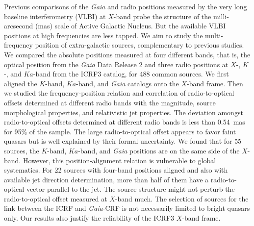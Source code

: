 \documentclass[referee]{aa}        %
\begin{document}
  \abstract
   {
       Previous comparisons of the \textit{Gaia} and radio positions measured by the very long baseline interferometry (VLBI) at $X$-band probe the structure of the milli-arcsecond (mas) scale of Active Galactic Nucleus.
       But the available VLBI positions at high frequencies are less tapped.
   }
   {
       We aim to study the multi-frequency position of extra-galactic sources, complementary to previous studies.}
   {
       We compared the absolute positions measured at four different bands,
       that is, the optical position from the {\it Gaia} Data Release 2 and three radio positions at $X$-, $K$-, and $Ka$-band from the ICRF3 catalog, for 488 common sources.
       We first aligned the $K$-band, $Ka$-band, and \textit{Gaia} catalogs onto the $X$-band frame.
       Then we studied the frequency-position relation and correlation of radio-to-optical offsets determined at different radio bands
       with the magnitude, source morphological properties, and relativistic jet properties.
   }
   {
       The deviation amongst radio-to-optical offsets determined at different radio bands is less than 0.54~mas for 95\% of the sample.
       The large radio-to-optical offset appears to favor faint quasars but is well explained by their formal uncertainty.
       We found that for 55 sources, the $K$-band, $Ka$-band, and \textit{Gaia} positions are on the same side of the $X$-band.
       However, this position-alignment relation is vulnerable to global systematics.
       For 22 sources with four-band positions aligned and also with available jet direction determination, more than half of them have a radio-to-optical vector parallel to the jet.
   }
   {
       The source structure might not perturb the radio-to-optical offset measured at $X$-band much.
       The selection of sources for the link between the ICRF and \textit{Gaia}-CRF is not necessarily limited to bright quasars only.
       Our results also justify the reliability of the ICRF3 $X$-band frame.
   }
\end{document}
